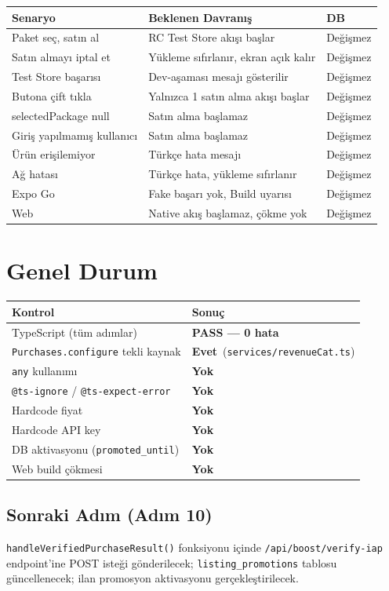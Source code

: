 \documentclass[12pt,a4paper]{article}
\begin{document}
\begin{longtable}{p{4cm} p{5.5cm} l}
  \toprule
  \textbf{Senaryo} & \textbf{Beklenen Davranış} & \textbf{DB}\\
  \midrule
  \endhead
  Paket seç, satın al & RC Test Store akışı başlar & Değişmez\\
  Satın almayı iptal et & Yükleme sıfırlanır, ekran açık kalır & Değişmez\\
  Test Store başarısı & Dev-aşaması mesajı gösterilir & Değişmez\\
  Butona çift tıkla & Yalnızca 1 satın alma akışı başlar & Değişmez\\
  selectedPackage null & Satın alma başlamaz & Değişmez\\
  Giriş yapılmamış kullanıcı & Satın alma başlamaz & Değişmez\\
  Ürün erişilemiyor & Türkçe hata mesajı & Değişmez\\
  Ağ hatası & Türkçe hata, yükleme sıfırlanır & Değişmez\\
  Expo Go & Fake başarı yok, Build uyarısı & Değişmez\\
  Web & Native akış başlamaz, çökme yok & Değişmez\\
  \bottomrule
\end{longtable}

\section{Genel Durum}

\begin{center}
\begin{tabular}{ll}
  \toprule
  \textbf{Kontrol} & \textbf{Sonuç}\\
  \midrule
  TypeScript (tüm adımlar) & \textcolor{successgreen}{\bfseries PASS — 0 hata}\\
  \texttt{Purchases.configure} tekli kaynak & \textcolor{successgreen}{\bfseries Evet}\ (\texttt{services/revenueCat.ts})\\
  \texttt{any} kullanımı & \textcolor{successgreen}{\bfseries Yok}\\
  \texttt{@ts-ignore} / \texttt{@ts-expect-error} & \textcolor{successgreen}{\bfseries Yok}\\
  Hardcode fiyat & \textcolor{successgreen}{\bfseries Yok}\\
  Hardcode API key & \textcolor{successgreen}{\bfseries Yok}\\
  DB aktivasyonu (\texttt{promoted\_until}) & \textcolor{successgreen}{\bfseries Yok}\\
  Web build çökmesi & \textcolor{successgreen}{\bfseries Yok}\\
  \bottomrule
\end{tabular}
\end{center}

\subsection{Sonraki Adım (Adım 10)}

\texttt{handleVerifiedPurchaseResult()} fonksiyonu içinde \texttt{/api/boost/verify-iap}
endpoint'ine POST isteği gönderilecek; \texttt{listing\_promotions} tablosu güncellenecek;
ilan promosyon aktivasyonu gerçekleştirilecek.
\end{document}
